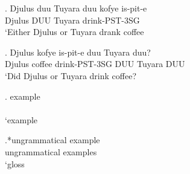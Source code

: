 \documentclass{article}
\begin{document}
\exg. Djulus duu Tuyara duu kofye is-pit-e\\
Djulus DUU Tuyara drink-PST-3SG\\
`Either Djulus or Tuyara drank coffee

\exg. Djulus kofye is-pit-e duu Tuyara duu?\\
Djulus coffee drink-PST-3SG DUU Tuyara DUU\\
`Did Djulus or Tuyara drink coffee?

\exg. example\\
\\
`example

\exg.*ungrammatical example\\
ungrammatical examples\\
`gloss
\end{document}
